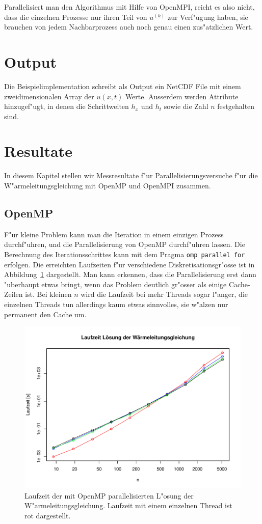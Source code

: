 Parallelisiert man den Algorithmus mit Hilfe von OpenMPI, reicht es also
nicht, dass die einzelnen Prozesse nur ihren Teil von
$u^{(k)}$ zur Verf"ugung haben, sie brauchen von jedem Nachbarprozess
auch noch genau einen zus"atzlichen Wert.

\section{Output}
Die Beispielimplementation schreibt als Output ein NetCDF File mit einem
zweidimensionalen Array der $u(x,t)$ Werte.
Ausserdem werden Attribute hinzugef"ugt, in denen die Schrittweiten
$h_x$ und $h_t$ sowie die Zahl $n$ festgehalten sind.

\section{Resultate}
In diesem Kapitel stellen wir Messresultate f"ur Parallelisierungsversuche
f"ur die W"armeleitungsgleichung mit OpenMP und OpenMPI zusammen.

\subsection{OpenMP}
F"ur kleine Problem kann man die Iteration in einem einzigen Prozess
durchf"uhren, und die Parallelisierung von OpenMP durchf"uhren lassen.
Die Berechnung des Iterationsschrittes kann mit dem Pragma
{\tt omp parallel for} erfolgen.
Die erreichten Laufzeiten f"ur verschiedene Diskretisationsgr"osse ist
in Abbildung~\ref{heat:laufzeit} dargestellt.
Man kann erkennen, dass die Parallelisierung erst dann "uberhaupt etwas
bringt, wenn das Problem deutlich gr"osser als einige Cache-Zeilen ist.
Bei kleinen $n$ wird die Laufzeit bei mehr Threads sogar l"anger, die
einzelnen Threads tun allerdings kaum etwas sinnvolles, sie w"alzen nur
permanent den Cache um.
\begin{figure}
\begin{center}
\includegraphics[width=\hsize]{heat/results-heat.pdf}
\end{center}
\caption{Laufzeit der mit OpenMP parallelisierten L"osung der
W"armeleitungsgleichung. Laufzeit mit einem einzelnen Thread ist rot
dargestellt.
\label{heat:laufzeit}}
\end{figure}

